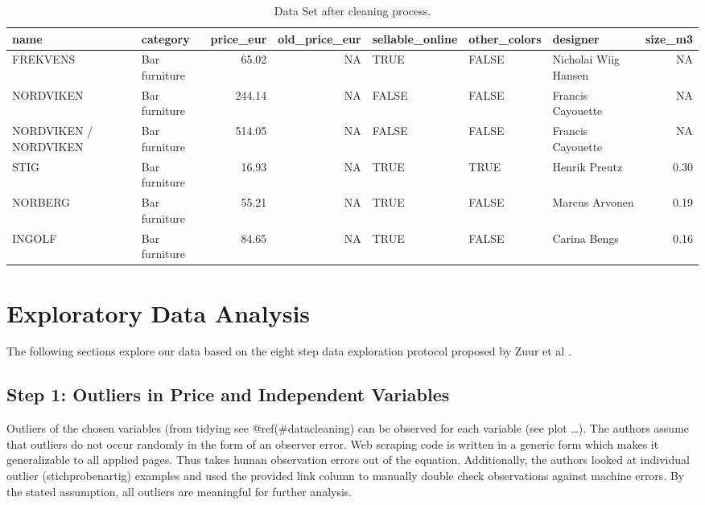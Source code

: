 \documentclass[a4paper, nobind]{templates/ociamthesis}
\begin{document}
\begin{table}

\caption{\label{tab:tidy-ikea}Data Set after cleaning process.}
\centering
\begin{tabular}[t]{l|l|r|r|l|l|l|r}
\hline
name & category & price\_eur & old\_price\_eur & sellable\_online & other\_colors & designer & size\_m3\\
\hline
FREKVENS & Bar furniture & 65.02 & NA & TRUE & FALSE & Nicholai Wiig Hansen & NA\\
\hline
NORDVIKEN & Bar furniture & 244.14 & NA & FALSE & FALSE & Francis Cayouette & NA\\
\hline
NORDVIKEN / NORDVIKEN & Bar furniture & 514.05 & NA & FALSE & FALSE & Francis Cayouette & NA\\
\hline
STIG & Bar furniture & 16.93 & NA & TRUE & TRUE & Henrik Preutz & 0.30\\
\hline
NORBERG & Bar furniture & 55.21 & NA & TRUE & FALSE & Marcus Arvonen & 0.19\\
\hline
INGOLF & Bar furniture & 84.65 & NA & TRUE & FALSE & Carina Bengs & 0.16\\
\hline
\end{tabular}
\end{table}

\hypertarget{tbd}{%
\section{Exploratory Data Analysis}\label{tbd}}

The following sections explore our data based on the eight step data exploration protocol proposed by Zuur et al \autocite{Zuur2010}.

\hypertarget{step-1-outliers-in-price-and-independent-variables}{%
\subsection{Step 1: Outliers in Price and Independent Variables}\label{step-1-outliers-in-price-and-independent-variables}}

Outliers of the chosen variables (from tidying see @ref(\#datacleaning) can be observed for each variable (see plot \ldots{}).
The authors assume that outliers do not occur randomly in the form of an observer error. Web scraping code is written in a generic form which makes it generalizable to all applied pages. Thus takes human observation errors out of the equation. Additionally, the authors looked at individual outlier (stichprobenartig) examples and used the provided link column to manually double check observations against machine errors.
By the stated assumption, all outliers are meaningful for further analysis.
\end{document}
